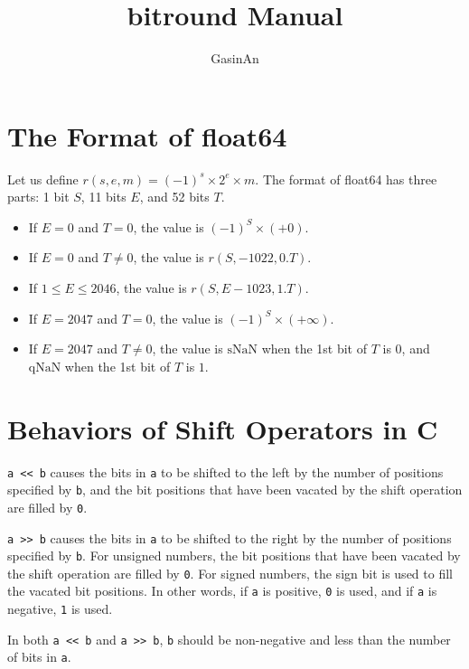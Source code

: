 \documentclass[a4paper,12pt]{article}
\title{bitround Manual}
\author{GasinAn}
\begin{document}
    \maketitle

    \tableofcontents

    \section{The Format of float64}

    Let us define $r(s,e,m)=(-1)^s\times2^e\times m$. The format of float64 has three parts: 1 bit $S$, 11 bits $E$, and 52 bits $T$.
    \begin{itemize}
        \item If $E=0$ and $T=0$, the value is $(-1)^S\times(+0)$.
        \item If $E=0$ and $T\neq0$, the value is $r(S,-1022,0.T)$.
        \item If $1\leq E\leq2046$, the value is $r(S,E-1023,1.T)$.
        \item If $E=2047$ and $T=0$, the value is $(-1)^S\times(+\infty)$.
        \item If $E=2047$ and $T\neq0$, the value is $\text{sNaN}$ when the 1st bit of $T$ is $0$, and $\text{qNaN}$ when the 1st bit of $T$ is $1$.
    \end{itemize}

    \section{Behaviors of Shift Operators in C}

    \verb|a << b| causes the bits in \verb|a| to be shifted to the left by the number of positions specified by \verb|b|, and the bit positions that have been vacated by the shift operation are filled by \verb|0|.

    \verb|a >> b| causes the bits in \verb|a| to be shifted to the right by the number of positions specified by \verb|b|. For unsigned numbers, the bit positions that have been vacated by the shift operation are filled by \verb|0|. For signed numbers, the sign bit is used to fill the vacated bit positions. In other words, if \verb|a| is positive, \verb|0| is used, and if \verb|a| is negative, \verb|1| is used.

    In both \verb|a << b| and \verb|a >> b|, \verb|b| should be non-negative and less than the number of bits in \verb|a|.
\end{document}
